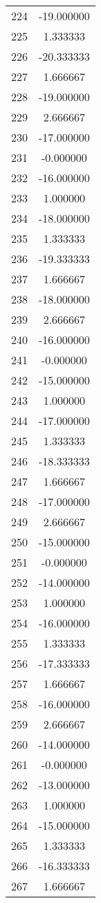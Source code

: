 \documentclass[12pt]{article}
\begin{document}
\begin{longtable}{@{}cc@{}}
224 & -19.000000 \\
225 & 1.333333 \\
226 & -20.333333 \\
227 & 1.666667 \\
228 & -19.000000 \\
229 & 2.666667 \\
230 & -17.000000 \\
231 & -0.000000 \\
232 & -16.000000 \\
233 & 1.000000 \\
234 & -18.000000 \\
235 & 1.333333 \\
236 & -19.333333 \\
237 & 1.666667 \\
238 & -18.000000 \\
239 & 2.666667 \\
240 & -16.000000 \\
241 & -0.000000 \\
242 & -15.000000 \\
243 & 1.000000 \\
244 & -17.000000 \\
245 & 1.333333 \\
246 & -18.333333 \\
247 & 1.666667 \\
248 & -17.000000 \\
249 & 2.666667 \\
250 & -15.000000 \\
251 & -0.000000 \\
252 & -14.000000 \\
253 & 1.000000 \\
254 & -16.000000 \\
255 & 1.333333 \\
256 & -17.333333 \\
257 & 1.666667 \\
258 & -16.000000 \\
259 & 2.666667 \\
260 & -14.000000 \\
261 & -0.000000 \\
262 & -13.000000 \\
263 & 1.000000 \\
264 & -15.000000 \\
265 & 1.333333 \\
266 & -16.333333 \\
267 & 1.666667 \\

\end{longtable}
\end{document}
